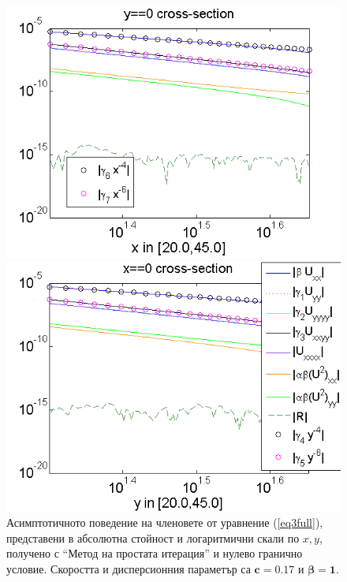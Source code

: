 \documentclass{article}
\newcommand{\rf}[1]{(\ref{#1})}
\theoremstyle{remark}
\begin{document}
\begin{figure}[ht]
	\begin{minipage}[b]{0.95\linewidth}
		\includegraphics[width=\linewidth]{AssymptForEachTerm/c017_bt1_5/ChristovIC_AlongX_50_ZB2_bt1_c017_h020_O(h^6).png}
	\end{minipage}
	\begin{minipage}[b]{0.95\linewidth}
		\includegraphics[width=\linewidth]{AssymptForEachTerm/c017_bt1_5/ChristovIC_AlongY_50_ZB2_bt1_c017_h020_O(h^6).png}
	\end{minipage}
	\caption{Асимптотичното поведение на членовете от уравнение \rf{eq3full}, представени в абсолютна стойност и логаритмични скали по $x,y$, получено с ``Метод на простата итерация'' и нулево гранично условие. Скоростта и дисперсионния параметър са $\boldsymbol{c=0.17}$ и $\boldsymbol{\beta = 1}$. }
	\label{fig:assympt_c017bt1}
\end{figure}
\end{document}

